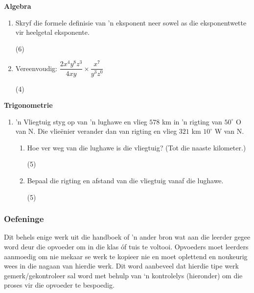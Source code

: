 \textbf{Algebra}
\begin{enumerate}[itemsep=0pt, label=\textbf{\arabic*}. ] 
\item Skryf die formele definisie van 'n eksponent neer sowel as die eksponentwette vir heelgetal eksponente.\begin{flushright}(6)\end{flushright}
\item Vereenvoudig: $\dfrac{2x^4y^8z^3}{4xy} \times \dfrac{x^7}{y^3z^0}$	\begin{flushright}(4)\end{flushright}
\end{enumerate}

\textbf{Trigonometrie}
\begin{enumerate}[itemsep=0pt, label=\textbf{\arabic*}. ] 
\item
  'n Vliegtuig styg op van 'n lughawe en vlieg  $578$ km in 'n
  rigting van $50^{\circ}$ O van N. Die vlieënier verander dan van rigting en vlieg $321$ km $10^{\circ}$ W van N.
\begin{enumerate}[itemsep=0pt,label=\textbf{(\alph*)}]
\item Hoe ver weg van die lughawe is die vliegtuig? (Tot die naaste kilometer.) \begin{flushright}(5)\end{flushright}
\item Bepaal die rigting en afstand van die vliegtuig vanaf die lughawe.\begin{flushright}(5)\end{flushright}
\end{enumerate}
\end{enumerate}

\subsubsection{Oefeninge}
Dit behels enige werk uit die handboek of 'n ander bron wat aan die leerder gegee word deur die opvoeder om in die klas óf tuis te voltooi. Opvoeders moet leerders aanmoedig om nie mekaar se werk te kopieer nie en moet oplettend en noukeurig wees in die nagaan van hierdie werk. Dit word aanbeveel dat hierdie tipe werk gemerk/gekontroleer sal word met behulp van ‘n kontrolelys (hieronder) om die proses vir die opvoeder te bespoedig. \par

